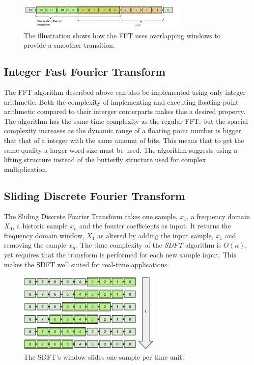 \begin{figure}[H]
    \centering
    \includegraphics[height=50px]{figures/theory/fft_window_overlap}
    \caption{The illustration shows how the FFT uses overlapping windows to provide a smoother transition. }
    \label{fig:fft_window_overlap}
\end{figure}

\subsection{Integer Fast Fourier Transform} \label{appendix:IntFFT}
The FFT algorithm described above can also be implemented using only integer 
arithmetic. Both the complexity of implementing and executing floating point
arithmetic compared to their interger conterparts makes this a desired property.
The algorithm has the same time complexity as the regular FFT, but the spacial 
complexity increases as the dynamic range of a floating point number is bigger
that that of a integer with the same amount of bits. This means that to get
the same quality a larger word size must be used. The algorithm suggests 
using a lifting structure instead of the butterfly structure used for complex
multiplication.

\subsection{Sliding Discrete Fourier Transform}\label{appendix:SDFT}
The Sliding Discrete Fourier Transform takes one sample, $x_1$, a frequency
domain $X_0$, a historic sample $x_n$ and the fourier coefficients as input.
It returns the frequency domain window, $X_1$ as altered by adding the input
sample, $x_1$ and removing the sample $x_n$. The time complexity of the {\it SDFT}
algorithm is $O(n)$, yet requires that the transform is performed for each 
new sample input. This makes the SDFT well suited for real-time applications.

\begin{figure}[H]
    \centering
    \includegraphics[height=150px]{figures/theory/sdft_window_slide}
    \caption{The SDFT's window slides one sample per time unit.}
    \label{fig:sdft_window_slide}
\end{figure}
